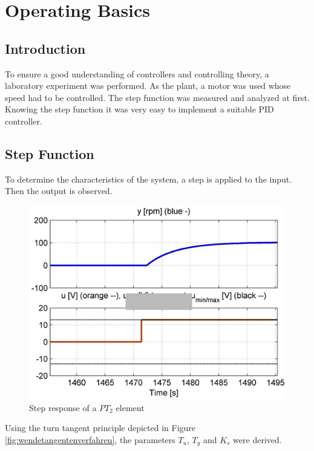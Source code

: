 \section{Operating Basics}

\subsection{Introduction}

To ensure a good understanding of controllers and controlling theory, a laboratory experiment was performed. As the plant, a motor was used whose speed had to be controlled.
The step function was measured and analyzed at first. Knowing the step function it was very easy to implement a suitable PID controller.

\subsection{Step Function}

To determine the characteristics of the system, a step is applied to the input. Then the output is observed.

\begin{figure}[H]
\begin{center}
\includegraphics[width=0.6\linewidth]{images/general/Step_Response}
\end{center}
\caption{Step response of a $PT_2$ element}
\label{fig:Step_Response}
\end{figure}

Using the turn tangent principle depicted in Figure \ref{fig:wendetangentenverfahren}, the parameters $T_u$, $T_g$ and $K_s$ were derived.

